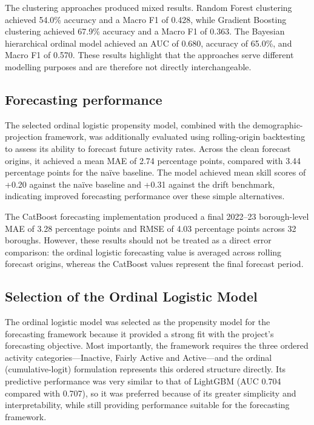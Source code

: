 \documentclass[ %
                    author={Ashrey Ashrey, Sanya Kapoor, Trisha Sharma, Yash Bhooshan Pandloskar},
                supervisor={Dr. Dalila O’Grady},
                    degree={MSc},
                     title={Using machine learning to forecast physical activity participation, volunteering and activity patterns in London},
                  subtitle={},
                      type={},
                      year={2021}]{dissertation}
\begin{document}
The clustering approaches produced mixed results. Random Forest clustering achieved 54.0\% accuracy and a Macro F1 of 0.428, while Gradient Boosting clustering achieved 67.9\% accuracy and a Macro F1 of 0.363. The Bayesian hierarchical ordinal model achieved an AUC of 0.680, accuracy of 65.0\%, and Macro F1 of 0.570. These results highlight that the approaches serve different modelling purposes and are therefore not directly interchangeable.

\FloatBarrier
\subsection{Forecasting performance}

\noindent
The selected ordinal logistic propensity model, combined with the demographic-projection framework, was additionally evaluated using rolling-origin backtesting to assess its ability to forecast future activity rates. Across the clean forecast origins, it achieved a mean MAE of 2.74 percentage points, compared with 3.44 percentage points for the naïve baseline. The model achieved mean skill scores of +0.20 against the naïve baseline and +0.31 against the drift benchmark, indicating improved forecasting performance over these simple alternatives.

The CatBoost forecasting implementation produced a final 2022--23 borough-level MAE of 3.28 percentage points and RMSE of 4.03 percentage points across 32 boroughs. However, these results should not be treated as a direct error comparison: the ordinal logistic forecasting value is averaged across rolling forecast origins, whereas the CatBoost values represent the final forecast period.

\FloatBarrier
\subsection{Selection of the Ordinal Logistic Model}

\noindent
The ordinal logistic model was selected as the propensity model for the forecasting framework because it provided a strong fit with the project’s forecasting objective. Most importantly, the framework requires the three ordered activity categories---Inactive, Fairly Active and Active---and the ordinal (cumulative-logit) formulation represents this ordered structure directly. Its predictive performance was very similar to that of LightGBM (AUC 0.704 compared with 0.707), so it was preferred because of its greater simplicity and interpretability, while still providing performance suitable for the forecasting framework.
\end{document}
